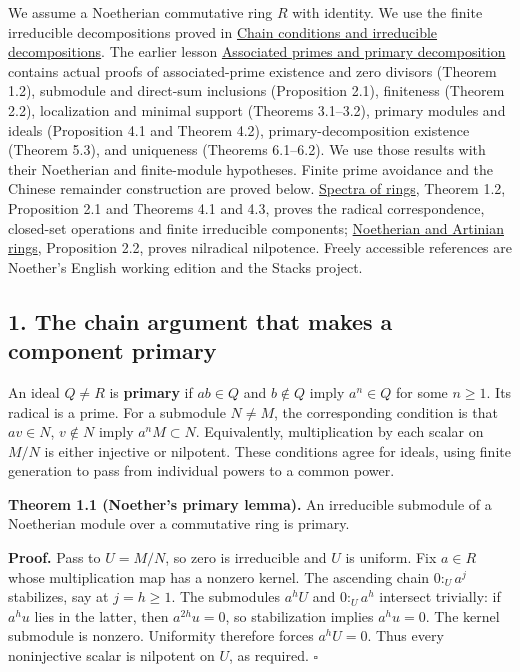 \documentclass[
]{article}
\begin{document}
We assume a Noetherian commutative ring \(R\) with identity. We use the
finite irreducible decompositions proved in
\href{../NOE-IDL-01.html}{Chain conditions and irreducible
decompositions}. The earlier lesson
\href{../prerequisites/AG-CA/AG-CA-04.html}{Associated primes and
primary decomposition} contains actual proofs of associated-prime
existence and zero divisors (Theorem 1.2), submodule and direct-sum
inclusions (Proposition 2.1), finiteness (Theorem 2.2), localization and
minimal support (Theorems 3.1--3.2), primary modules and ideals
(Proposition 4.1 and Theorem 4.2), primary-decomposition existence
(Theorem 5.3), and uniqueness (Theorems 6.1--6.2). We use those results
with their Noetherian and finite-module hypotheses. Finite prime
avoidance and the Chinese remainder construction are proved below.
\href{../prerequisites/AG-CA/AG-CA-01.html}{Spectra of rings}, Theorem
1.2, Proposition 2.1 and Theorems 4.1 and 4.3, proves the radical
correspondence, closed-set operations and finite irreducible components;
\href{../prerequisites/AG-CA/AG-CA-03.html}{Noetherian and Artinian
rings}, Proposition 2.2, proves nilradical nilpotence. Freely accessible
references are Noether's English working edition and the Stacks project.

\subsection{1. The chain argument that makes a component
primary}\label{the-chain-argument-that-makes-a-component-primary}

An ideal \(Q\ne R\) is \textbf{primary} if \(ab\in Q\) and \(b\notin Q\)
imply \(a^n\in Q\) for some \(n\ge1\). Its radical is a prime. For a
submodule \(N\ne M\), the corresponding condition is that \(av\in N\),
\(v\notin N\) imply \(a^nM\subset N\). Equivalently, multiplication by
each scalar on \(M/N\) is either injective or nilpotent. These
conditions agree for ideals, using finite generation to pass from
individual powers to a common power.

\textbf{Theorem 1.1 (Noether's primary lemma).} An irreducible submodule
of a Noetherian module over a commutative ring is primary.

\textbf{Proof.} Pass to \(U=M/N\), so zero is irreducible and \(U\) is
uniform. Fix \(a\in R\) whose multiplication map has a nonzero kernel.
The ascending chain \(0:_U a^j\) stabilizes, say at \(j=h\ge1\). The
submodules \(a^hU\) and \(0:_U a^h\) intersect trivially: if \(a^hu\)
lies in the latter, then \(a^{2h}u=0\), so stabilization implies
\(a^hu=0\). The kernel submodule is nonzero. Uniformity therefore forces
\(a^hU=0\). Thus every noninjective scalar is nilpotent on \(U\), as
required. \(\square\)
\end{document}
